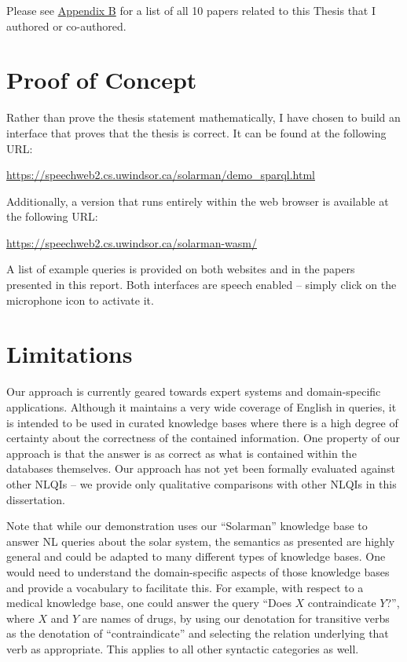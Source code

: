 \documentclass[../main.tex]{subfiles}
\begin{document}
\begin{refsection}
Please see \hyperref[appendix:b]{Appendix B} for a list of all 10 papers related to this Thesis that I authored or co-authored.

\section{Proof of Concept}

Rather than prove the thesis statement mathematically, I have chosen to build an interface that
proves that the thesis is correct.  It can be found at the following URL:

\begin{center}
    \url{https://speechweb2.cs.uwindsor.ca/solarman/demo_sparql.html}
\end{center}
Additionally, a version that runs entirely within the web browser is available at
the following URL:
\begin{center}
    \url{https://speechweb2.cs.uwindsor.ca/solarman-wasm/}
\end{center}
A list of example queries is provided on both websites and in the papers presented in this report.
Both interfaces are speech enabled -- simply click on the microphone icon to activate it.

\section{Limitations}

Our approach is currently geared towards expert systems and domain-specific applications. Although it
maintains a very wide coverage of English in queries, it is intended to be used in curated knowledge bases where there is a high degree of certainty about the correctness of the contained information.  One property of our approach is that the answer is as correct as what is contained within the databases themselves.  Our approach has not yet been formally evaluated against other NLQIs -- we provide only qualitative comparisons with other NLQIs in this dissertation.

Note that while our demonstration uses our ``Solarman'' knowledge base to answer NL queries about the solar system, the semantics as presented are highly general and could be adapted to many different types of knowledge bases.  One would need to understand the domain-specific aspects of those knowledge bases and provide a vocabulary to facilitate this.  For example, with respect to a medical knowledge base, one could answer the query ``Does $X$ contraindicate $Y$?'', where $X$ and $Y$ are names of drugs, by using our denotation for transitive verbs as the denotation of ``contraindicate'' and selecting the relation underlying that verb as appropriate.  This applies to all other syntactic categories as well.


\end{refsection}
\end{document}
